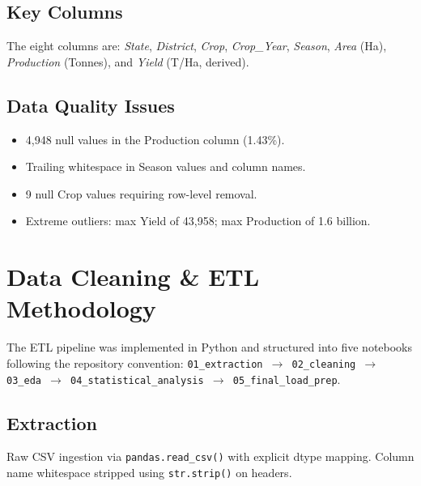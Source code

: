 \documentclass[10pt]{article}
\begin{document}
\subsection{Key Columns}
The eight columns are: \textit{State}, \textit{District}, \textit{Crop},
\textit{Crop\_Year}, \textit{Season}, \textit{Area} (Ha), \textit{Production}
(Tonnes), and \textit{Yield} (T/Ha, derived).

\subsection{Data Quality Issues}
\begin{itemize}[leftmargin=*, topsep=2pt, itemsep=1pt]
  \item 4,948 null values in the Production column (1.43\%).
  \item Trailing whitespace in Season values and column names.
  \item 9 null Crop values requiring row-level removal.
  \item Extreme outliers: max Yield of 43,958; max Production of 1.6 billion.
\end{itemize}

\section{Data Cleaning \& ETL Methodology}

The ETL pipeline was implemented in Python and structured into five notebooks
following the repository convention:
\texttt{01\_extraction $\to$ 02\_cleaning $\to$ 03\_eda $\to$
04\_statistical\_analysis $\to$ 05\_final\_load\_prep}.

\subsection{Extraction}
Raw CSV ingestion via \texttt{pandas.read\_csv()} with explicit dtype mapping.
Column name whitespace stripped using \texttt{str.strip()} on headers.
\end{document}
